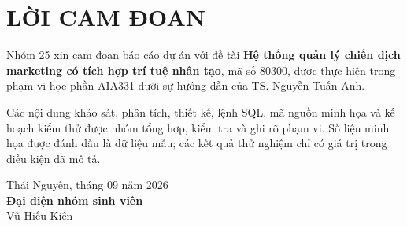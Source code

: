 \chapter*{LỜI CAM ĐOAN}

Nhóm 25 xin cam đoan báo cáo dự án với đề tài \textbf{Hệ thống quản lý chiến dịch marketing có tích hợp trí tuệ nhân tạo}, mã số 80300, được thực hiện trong phạm vi học phần AIA331 dưới sự hướng dẫn của TS. Nguyễn Tuấn Anh.

Các nội dung khảo sát, phân tích, thiết kế, lệnh SQL, mã nguồn minh họa và kế hoạch kiểm thử được nhóm tổng hợp, kiểm tra và ghi rõ phạm vi. Số liệu minh họa được đánh dấu là dữ liệu mẫu; các kết quả thử nghiệm chỉ có giá trị trong điều kiện đã mô tả.

\begin{flushright}
Thái Nguyên, tháng 09 năm 2026\\[13mm]
\textbf{Đại diện nhóm sinh viên}\\[20mm]
Vũ Hiếu Kiên
\end{flushright}
